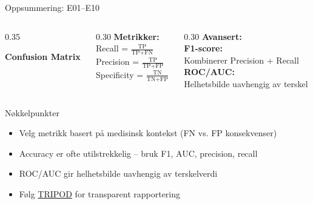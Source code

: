 \documentclass[aspectratio=169, 10pt]{beamer}
\begin{document}
\begin{frame}{Oppsummering: E01--E10}

    \begin{columns}[T]
        \begin{column}{0.35\textwidth}
            \begin{center}
                \textbf{Confusion Matrix}\\[2mm]
            \end{center}
        \end{column}
        \begin{column}{0.30\textwidth}
            \textbf{Metrikker:}\\[1mm]
            \footnotesize
            Recall = $\frac{\text{TP}}{\text{TP}+\text{FN}}$\\[2mm]
            Precision = $\frac{\text{TP}}{\text{TP}+\text{FP}}$\\[2mm]
            Specificity = $\frac{\text{TN}}{\text{TN}+\text{FP}}$
        \end{column}
        \begin{column}{0.30\textwidth}
            \textbf{Avansert:}\\[1mm]
            \footnotesize
            \textbf{F1-score:}\\
            Kombinerer Precision + Recall\\[2mm]
            \textbf{ROC/AUC:}\\
            Helhetsbilde uavhengig av terskel
        \end{column}
    \end{columns}

    \vspace{3mm}

    \begin{block}{\footnotesize Nøkkelpunkter}
        \footnotesize
        \begin{itemize}
            \item Velg metrikk basert på medisinsk kontekst (FN vs. FP konsekvenser)
            \item Accuracy er ofte utilstrekkelig -- bruk F1, AUC, precision, recall
            \item ROC/AUC gir helhetsbilde uavhengig av terskelverdi
            \item Følg \href{https://www.tripod-statement.org/}{TRIPOD} for transparent rapportering
        \end{itemize}
    \end{block}

\end{frame}
\end{document}
